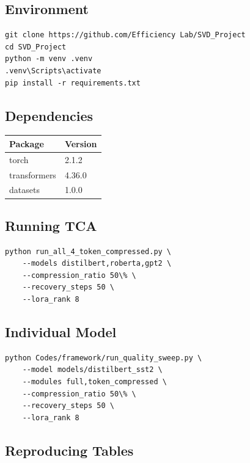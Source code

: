 \subsection{Environment}

\begin{lstlisting}
git clone https://github.com/Efficiency Lab/SVD_Project
cd SVD_Project
python -m venv .venv
.venv\Scripts\activate
pip install -r requirements.txt
\end{lstlisting}

\subsection{Dependencies}

\begin{table}[H]
\centering
\small
\begin{tabular}{ll}
\toprule
\textbf{Package} & \textbf{Version} \\
\midrule
torch & 2.1.2 \\
transformers & 4.36.0 \\
datasets & 1.0.0 \\
\bottomrule
\end{tabular}
\end{table}

\subsection{Running TCA}

\begin{lstlisting}
python run_all_4_token_compressed.py \
    --models distilbert,roberta,gpt2 \
    --compression_ratio 50\% \
    --recovery_steps 50 \
    --lora_rank 8
\end{lstlisting}

\subsection{Individual Model}

\begin{lstlisting}
python Codes/framework/run_quality_sweep.py \
    --model models/distilbert_sst2 \
    --modules full,token_compressed \
    --compression_ratio 50\% \
    --recovery_steps 50 \
    --lora_rank 8
\end{lstlisting}

\subsection{Reproducing Tables}

